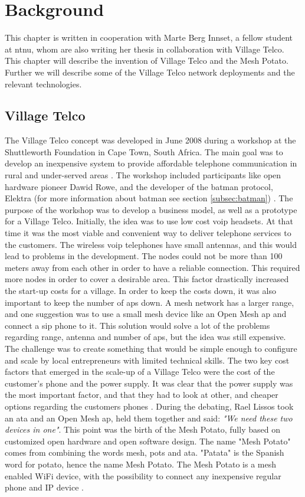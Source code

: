 \chapter{Background}
\label{chp:background} 

This chapter is written in cooperation with Marte Berg Innset, a fellow student at \gls{ntnu}, whom are also writing her thesis in collaboration with Village Telco. This chapter will describe the invention of Village Telco and the Mesh Potato. Further we will describe some of the Village Telco network deployments and the relevant technologies. 

\section{Village Telco}
The Village Telco concept was developed in June 2008 during a workshop at the Shuttleworth Foundation in Cape Town, South Africa. The main goal was to develop an inexpensive system to provide affordable telephone communication in rural and under-served areas \cite{MParticle}. The workshop included participants like open hardware pioneer Dawid Rowe, and the developer of the \gls{batman} protocol, Elektra (for more information about \gls{batman} see section \ref{subsec:batman}) \cite{MPworkshop}. The purpose of the workshop was to develop a business model, as well as a prototype for a Village Telco. Initially, the idea was to use low cost \gls{voip} headsets. At that time it was the most viable and convenient way to deliver telephone services to the customers. The wireless \gls{voip} telephones have small antennas, and this would lead to problems in the development. The nodes could not be more than 100 meters away from each other in order to have a reliable connection. This required more nodes in order to cover a desirable area. This factor drastically increased the start-up costs for a village. In order to keep the costs down, it was also important to keep the number of \glspl{ap} down. A mesh network has a larger range, and one suggestion was to use a small mesh device like an Open Mesh \gls{ap} and connect a \gls{sip} phone to it. This solution would solve a lot of the problems regarding range, antenna and number of \glspl{ap}, but the idea was still expensive. The challenge was to create something that would be simple enough to configure and scale by local entrepreneurs with limited technical skills. The two key cost factors that emerged in the scale-up of a Village Telco were the cost of the customer's phone and the power supply. It was clear that the power supply was the most important factor, and that they had to look at other, and cheaper options regarding the customers phones \cite{MPworkshop}. During the debating, Rael Lissos took an \gls{ata} and an Open Mesh \gls{ap}, held them together and said: \textit{"We need these two devices in one"}. This point was the birth of the Mesh Potato, fully based on customized open hardware and open software design. The name "Mesh Potato" comes from combining the words mesh, \gls{pots} and \gls{ata}. "Patata" is the Spanish word for potato, hence the name Mesh Potato. The Mesh Potato is a mesh enabled WiFi device, with the possibility to connect any inexpensive regular phone and IP device \cite{MPorigin}.


